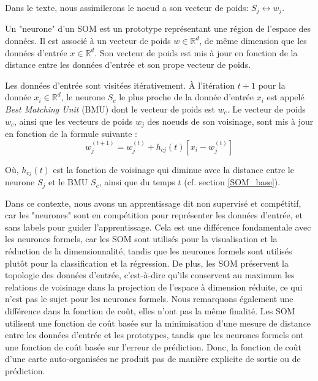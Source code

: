 \documentclass[12pt,a4paper]{report}
\begin{document}
Dans le texte, nous assimilerons le noeud a son vecteur de poids: $S_j \leftrightarrow w_j$.

Un "neurone" d'un SOM est un prototype représentant une région de l'espace des données.
Il est associé à un vecteur de poids $w \in \mathbb{R}^d$, de même dimension que les données d'entrée $x \in \mathbb{R}^d$. 
Son vecteur de poids est mis à jour en fonction de la distance entre les données d'entrée et son prope vecteur de poids. 

Les données d'entrée sont visitées itérativement. À l'itération $t+1$ pour la donnée $x_i \in \mathbb{R}^d$, 
le neurone $S_c$ le plus proche de la donnée d'entrée $x_i$ est appelé \textit{Best Matching Unit} (BMU) dont le vecteur de poids est $w_c$. 
Le vecteur de poids $w_c$, ainsi que les vecteurs de poids $w_j$ des noeuds de son voisinage, sont mis à jour en fonction de la formule suivante : 
$$w_j^{(t+1)} = w_j^{(t)} + h_{cj}(t)[x_i - w_j^{(t)}]$$ 

Où, $h_{cj}(t)$ est la fonction de voisinage qui diminue avec la distance entre le neurone $S_j$ et le BMU $S_c$, ainsi que du temps $t$ \cite{Kohonen2012SOM} (cf. section \ref{SOM_base}).

Dans ce contexte, nous avons un apprentissage dit non supervisé et compétitif, car les "neurones" sont en compétition pour représenter les données d'entrée, et sans labels pour guider l'apprentissage.
Cela est une différence fondamentale avec les neurones formels, car les SOM sont utilisés pour la visualisation et la réduction de la dimensionnalité, 
tandis que les neurones formels sont utilisés plutôt pour la classification et la régression. 
De plus, les SOM préservent la topologie des données d'entrée, c'est-à-dire qu'ils conservent au maximum les relations de voisinage dans la projection de l'espace à dimension réduite, ce qui n'est pas le sujet pour les neurones formels. 
Nous remarquons également une différence dans la fonction de coût, elles n'ont pas la même finalité.
Les SOM utilisent une fonction de coût basée sur la minimisation d'une mesure de distance entre les données d'entrée et les prototypes, tandis que les neurones formels ont 
une fonction de coût basée sur l'erreur de prédiction. Donc, la fonction de coût d'une carte auto-organisées ne produit pas de manière explicite de sortie ou de prédiction. 
\end{document}
